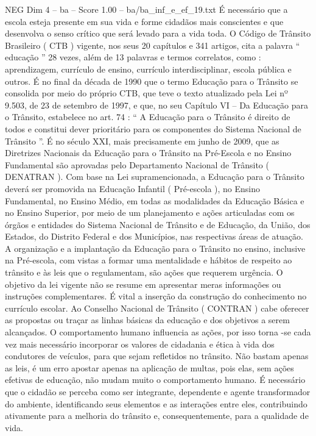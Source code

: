 \begin{textsample}{NEG Dim 4 – ba – Score 1.00 – ba/ba\_inf\_e\_ef\_19.txt}
É necessário que a escola esteja presente em sua vida e forme cidadãos mais conscientes e que desenvolva o senso crítico que será levado para a vida toda.
O Código de Trânsito Brasileiro ( CTB ) vigente, nos seus 20 capítulos e 341 artigos, cita a palavra “ educação ” 28 vezes, além de 13 palavras e termos correlatos, como : aprendizagem, currículo de ensino, currículo interdisciplinar, escola pública e outros.
É no final da década de 1990 que o termo Educação para o Trânsito se consolida por meio do próprio CTB, que teve o texto atualizado pela Lei nº 9.503, de 23 de setembro de 1997, e que, no seu Capítulo VI – Da Educação para o Trânsito, estabelece no art. 74 : “ A Educação para o Trânsito é direito de todos e constitui dever prioritário para os componentes do Sistema Nacional de Trânsito ”.
É no século XXI, mais precisamente em junho de 2009, que as Diretrizes Nacionais da Educação para o Trânsito na Pré-Escola e no Ensino Fundamental são aprovadas pelo Departamento Nacional de Trânsito ( DENATRAN ).
Com base na Lei supramencionada, a Educação para o Trânsito deverá ser promovida na Educação Infantil ( Pré-escola ), no Ensino Fundamental, no Ensino Médio, em todas as modalidades da Educação Básica e no Ensino Superior, por meio de um planejamento e ações articuladas com os órgãos e entidades do Sistema Nacional de Trânsito e de Educação, da União, dos Estados, do Distrito Federal e dos Municípios, nas respectivas áreas de atuação.
A organização e a implantação da Educação para o Trânsito no ensino, inclusive na Pré-escola, com vistas a formar uma mentalidade e hábitos de respeito ao trânsito e às leis que o regulamentam, são ações que requerem urgência.
O objetivo da lei vigente não se resume em apresentar meras informações ou instruções complementares.
É vital a inserção da construção do conhecimento no currículo escolar.
Ao Conselho Nacional de Trânsito ( CONTRAN ) cabe oferecer as propostas ou traçar as linhas básicas da educação e dos objetivos a serem alcançados.
O comportamento humano influencia as ações, por isso torna -se cada vez mais necessário incorporar os valores de cidadania e ética à vida dos condutores de veículos, para que sejam refletidos no trânsito.
Não bastam apenas as leis, é um erro apostar apenas na aplicação de multas, pois elas, sem ações efetivas de educação, não mudam muito o comportamento humano.
É necessário que o cidadão se perceba como ser integrante, dependente e agente transformador do ambiente, identificando seus elementos e as interações entre eles, contribuindo ativamente para a melhoria do trânsito e, consequentemente, para a qualidade de vida.

\end{textsample}
